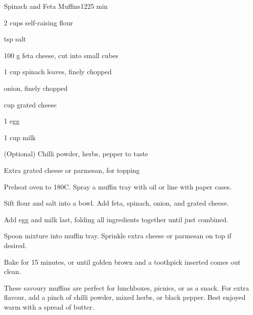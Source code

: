 \begin{recipebox}{Spinach and Feta Muffins}{12}{25 min}
\begin{ingredients}
  \item 2 cups self-raising flour
  \item {} tsp salt
  \item 100 g feta cheese, cut into small cubes
  \item 1 cup spinach leaves, finely chopped
  \item {} onion, finely chopped
  \item {} cup grated cheese
  \item 1 egg
  \item 1 cup milk
  \item (Optional) Chilli powder, herbs, pepper to taste
  \item Extra grated cheese or parmesan, for topping
\end{ingredients}

\begin{method}
  \item Preheat oven to 180\degree C. Spray a muffin tray with oil or line with paper cases.
  \item Sift flour and salt into a bowl. Add feta, spinach, onion, and grated cheese.  
  \item Add egg and milk last, folding all ingredients together until just combined.  
  \item Spoon mixture into muffin tray. Sprinkle extra cheese or parmesan on top if desired.  
  \item Bake for 15 minutes, or until golden brown and a toothpick inserted comes out clean.  
\end{method}

\begin{notes}
These savoury muffins are perfect for lunchboxes, picnics, or as a snack.  
For extra flavour, add a pinch of chilli powder, mixed herbs, or black pepper.  
Best enjoyed warm with a spread of butter.  
\end{notes}
\end{recipebox}


